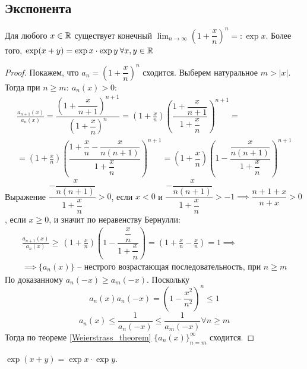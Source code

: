 \subsection{Экспонента}
\begin{theorem}
    Для любого $ x \in \mathbb{R} $ существует конечный $ \lim_{n \to \infty}\left(1 + \dfrac{x}{n}\right)^n = : \exp x $.
    Более того, $ \exp(x + y) = \exp x \cdot \exp y \: \forall x, y \in \mathbb{R} $
\end{theorem} \begin{proof}
    Покажем, что $ a_n = \left(1 + \dfrac{x}{n}\right)^ n $ сходится. Выберем натуральное $ m > |x| $. Тогда при $ n \geq  m:\: a_n(x) > 0 $: \begin{multline}
        \frac{a_{n + 1}(x)}{a_n(x)} = \dfrac{\left(1 + \dfrac{x}{n + 1}\right)^{n + 1}}{\left(1 + \dfrac{x}{n}\right)^n} = \left(1 + \frac{x}{n}\right)\left(\dfrac{1 + \dfrac{x}{n + 1}}{1 + \dfrac{x}{n}}\right)^{n + 1} =\\=\left(1 + \frac{x}{n}\right)\left(\dfrac{1 + \dfrac{x}{n} - \dfrac{x}{n(n + 1)}}{1 + \dfrac{x}{n}}\right)^{n + 1} = \left(1 + \dfrac{x}{n}\right)\left(1 - \dfrac{\dfrac{x}{n(n + 1)}}{1 + \dfrac{x}{n}}\right)^{n + 1}
    \end{multline}
    Выражение $ \dfrac{ - \dfrac{x}{n(n + 1)}}{1 + \dfrac{x}{n}} > 0$, если $ x < 0$ и $ \dfrac{ - \dfrac{x}{n(n + 1)}}{1 + \dfrac{x}{n}}> - 1 \implies  \dfrac{n + 1 + x}{n + x} > 0 $, если $ x \geq 0 $, и значит по неравенству Бернулли: \begin{multline}
        \frac{a_{n + 1}(x)}{a_n(x)} \geq\, \left(1 + \frac{x}{n}\right)\left(1 - \dfrac{\dfrac{x}{n}}{1 + \dfrac{x}{n}}\right) = \left(1 + \frac{x}{n} - \frac{x}{n}\right) = 1 \implies\\ \implies  \{a_n(x)\} \text{ -- нестрого возрастающая последовательность, при } n \geq m 
    \end{multline}
    По доказанному $ a_n( - x) \geq  a_m( - x) $. Поскольку \begin{equation}
        a_n(x)a_n( - x) = \left(1 - \frac{x^2}{n^2}\right)^n \leq 1
    \end{equation}
    \begin{equation}
    a_n(x) \leq \frac{1}{a_n( - x)} \leq \frac{1}{a_m( - x)} \forall n \geq m
   \end{equation}
   Тогда по теореме \ref{Weierstrass_theorem} $ \{a_n(x)\}_{n = m}^ \infty $ сходится.
\end{proof} \begin{proposition}
     $ \exp(x + y) = \exp x \cdot \exp y $.

\end{proposition}
